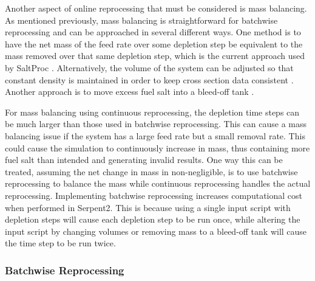 
Another aspect of online reprocessing that must be considered is mass balancing.
As mentioned previously, mass balancing is straightforward for batchwise reprocessing and can be approached in several different ways.
One method is to have the net mass of the feed rate over some depletion step be equivalent to the mass removed over that same depletion step, which is the current approach used by SaltProc \cite{rykhlevskii_modeling_2019}. Alternatively, the volume of the system can be adjusted so that constant density is maintained in order to keep cross section data consistent \cite{ridley_method_2017}. Another approach is to move excess fuel salt into a bleed-off tank \cite{ridley_method_2017}.

For mass balancing using continuous reprocessing, the depletion time steps can be much larger than those used in batchwise reprocessing.
This can cause a mass balancing issue if the system has a large feed rate but a small removal rate.
This could cause the simulation to continuously increase in mass, thus containing more fuel salt than intended and generating invalid results.
One way this can be treated, assuming the net change in mass in non-negligible, is to use batchwise reprocessing to balance the mass while continuous reprocessing handles the actual reprocessing.
Implementing batchwise reprocessing increases computational cost when performed in Serpent2. This is because using a single input script with depletion steps will cause each depletion step to be run once, while altering the input script by changing volumes or removing mass to a bleed-off tank will cause the time step to be run twice.

\subsubsection{Batchwise Reprocessing}


